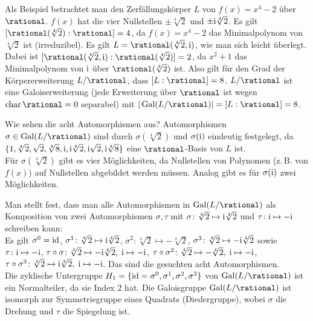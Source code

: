 \begin{Bsp}
    Als Beispiel betrachtet man den Zerfällungskörper $L$ von
    $f(x) = x^4 - 2$ über $\rational$.
    $f(x)$ hat die vier Nullstellen
    $\pm\sqrt[4]{2}$ und $\pm\text{i}\sqrt[4]{2}$.
    Es gilt $[\rational(\sqrt[4]{2}):\rational] = 4$, da
    $f(x) = x^4 - 2$ das Minimalpolynom von $\sqrt[4]{2}$ ist (irreduzibel).
    Es gilt $L = \rational(\sqrt[4]{2}, \i)$, wie man sich leicht überlegt.
    Dabei ist $[\rational(\sqrt[4]{2}, \i):\rational(\sqrt[4]{2})] = 2$,
    da $x^2 + 1$ das Minimalpolynom von $\text{i}$ über $\rational(\sqrt[4]{2})$ ist.
    Also gilt für den Grad der Körpererweiterung $L/\rational$, dass
    $[L:\rational] = 8$.
    $L/\rational$ ist eine Galoiserweiterung
    (jede Erweiterung über $\rational$ ist wegen $\Char \rational = 0$
    separabel) mit
    $|\Gal(L/\rational)| = [L:\rational] = 8$.

    Wie sehen die acht Automorphismen aus?
    Automorphismen $\sigma \in \Gal(L/\rational)$ sind durch
    $\sigma(\sqrt[4]{2})$ und $\sigma(\text{i})$ eindeutig festgelegt, da
    $\{1, \sqrt[4]{2}, \sqrt{2}, \sqrt[4]{8},
    \text{i}, \text{i}\sqrt[4]{2}, \text{i}\sqrt{2}, \text{i}\sqrt[4]{8}\}$
    eine $\rational$-Basis von $L$ ist.\\
    Für $\sigma(\sqrt[4]{2})$ gibt es vier Möglichkeiten,
    da Nullstellen von Polynomen (z.\,B. von $f(x)$) auf Nullstellen
    abgebildet werden müssen.
    Analog gibt es für $\sigma(\text{i})$ zwei Möglichkeiten.

    Man stellt fest, dass man alle Automorphismen in $\Gal(L/\rational)$
    als Komposition von zwei Automorphismen $\sigma, \tau$ mit
    $\sigma\colon \sqrt[4]{2} \mapsto \text{i}\sqrt[4]{2}$ und
    $\tau\colon \text{i} \mapsto -\text{i}$ schreiben kann:\\
    Es gilt $\sigma^0 = \operatorname{id}$,\qquad
    $\sigma^1\colon \sqrt[4]{2} \mapsto \text{i}\sqrt[4]{2}$,\qquad
    $\sigma^2\colon \sqrt[4]{2} \mapsto -\sqrt[4]{2}$,\qquad
    $\sigma^3\colon \sqrt[4]{2} \mapsto -\text{i}\sqrt[4]{2}$ sowie\\
    $\tau\colon \text{i} \mapsto -\text{i}$,\qquad
    $\tau \circ \sigma\colon \sqrt[4]{2} \mapsto -\text{i}\sqrt[4]{2},\;
    \text{i} \mapsto -\text{i}$,\qquad
    $\tau \circ \sigma^2\colon \sqrt[4]{2} \mapsto -\sqrt[4]{2},\;
    \text{i} \mapsto -\text{i}$,\\
    $\tau \circ \sigma^3\colon \sqrt[4]{2} \mapsto \text{i}\sqrt[4]{2},\;
    \text{i} \mapsto -\text{i}$.
    Das sind die gesuchten acht Automorphismen.\\
    Die zyklische Untergruppe
    $H_1 = \{\operatorname{id} = \sigma^0, \sigma^1, \sigma^2, \sigma^3\}$ von
    $\Gal(L/\rational)$ ist ein Normalteiler, da sie Index $2$ hat.
    Die Galoisgruppe $\Gal(L/\rational)$ ist isomorph zur
    Symmetriegruppe eines Quadrats (Diedergruppe),
    wobei $\sigma$ die Drehung und $\tau$ die Spiegelung ist.


\end{Bsp}
